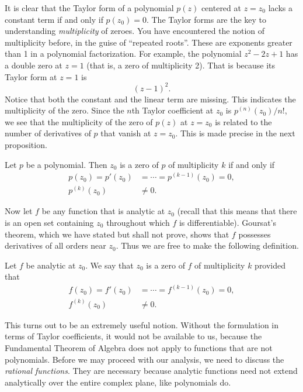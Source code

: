 \documentclass[twocolumn,12pt]{article}
\begin{document}
It is clear that the Taylor form of a polynomial $p(z)$ centered at $z = z_0$ lacks a constant term if and only if $p(z_0) = 0$. The Taylor forms are the key to understanding \emph{multiplicity} of zeroes. You have encountered the notion of multiplicity before, in the guise of ``repeated roots''. These are exponents greater than 1 in a polynomial factorization. For example, the  polynomial $z^2 - 2z + 1$ has a double zero at $z = 1$ (that is, a zero of multiplicity 2). That is because its Taylor form at $z = 1$ is
\[
  (z-1)^2.
\]
Notice that both the constant and the linear term are missing. This indicates the multiplicity of the zero. Since the $n$th Taylor coefficient at $z_0$ is $p^{(n)}(z_0)/n!$, we see that the multiplicity of the zero of $p(z)$ at $z = z_0$ is related to the number of derivatives of $p$ that vanish at $z = z_0$. This is made precise in the next proposition.
\begin{proposition}
  Let $p$ be a polynomial. Then $z_0$ is a zero of $p$ of multiplicity $k$ if and only if
  \begin{align*}
    p(z_0) = p'(z_0) &= \cdots = p^{(k-1)}(z_0) = 0, \\
    p^{(k)}(z_0) &\ne 0.
  \end{align*}
\end{proposition}
Now let $f$ be any function that is analytic at $z_0$ (recall that this means that there is an open set containing $z_0$ throughout which $f$ is differentiable). Goursat's theorem, which we have stated but shall not prove, shows that $f$ possesses derivatives of all orders near $z_0$. Thus we are free to make the following definition.
\begin{definition}
  Let $f$ be analytic at $z_0$. We say that $z_0$ is a zero of $f$ of multiplicity $k$ provided that
  \begin{align*}
    f(z_0) = f'(z_0) &= \cdots = f^{(k-1)}(z_0) = 0, \\
    f^{(k)}(z_0) &\ne 0.
  \end{align*}
\end{definition}
This turns out to be an extremely useful notion. Without the formulation in terms of Taylor coefficients, it would not be available to us, because the Fundamental Theorem of Algebra does not apply to functions that are not polynomials. Before we may proceed with our analysis, we need to discuss the \emph{rational functions}. They are necessary because analytic functions need not extend analytically over the entire complex plane, like polynomials do.
\end{document}
